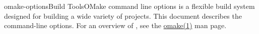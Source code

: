 %
%
%
\begin{Name}{1}{omake-options}{\authors}{Build Tools}{OMake command line options}
   is a flexible build system designed for building a wide variety of projects.
  This document describes the command-line options.
  For an overview of , see the \href{omake.html}{omake(1)} man page.
\end{Name}


